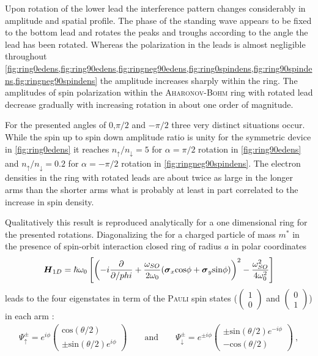Upon rotation of the lower lead the interference pattern changes considerably in amplitude and spatial profile. The phase of the standing wave appears to be fixed to the bottom lead and rotates the peaks and troughs according to the angle the lead has been rotated. Whereas the polarization in the leads is almost negligible throughout \cref{fig:ring0edens,fig:ring90edens,fig:ringneg90edens,fig:ring0spindens,fig:ring90spindens,fig:ringneg90spindens} the amplitude increases sharply within the ring. The amplitudes of spin polarization within the \textsc{Aharonov-Bohm} ring with rotated lead decrease gradually with increasing rotation in about one order of magnitude.\par
For the presented angles of 0,$\pi/2$ and $-\pi/2$ three very distinct situations occur. While the spin up to spin down amplitude ratio is unity for the symmetric device in \cref{fig:ring0edens} it reaches $n_{\uparrow}/n_{\downarrow}=5$ for $\alpha=\pi/2$ rotation in \cref{fig:ring90edens} and $n_{\uparrow}/n_{\downarrow}=0.2$ for $\alpha=-\pi/2$ rotation in \cref{fig:ringneg90spindens}. The electron densities in the ring with rotated leads are about twice as large in the longer arms than the shorter arms what is probably at least in part correlated to the increase in spin density.\par
Qualitatively this result is reproduced analytically for a one dimensional ring for the presented rotations. Diagonalizing the \hamil{} for a charged particle of mass $m^*$ in the presence of spin-orbit interaction closed ring of radius $a$ in polar coordinates \cite{PhysRevB.73.155325} 
\begin{align}
\boldsymbol{H}_{1D}=\hbar\omega_0 \left[\left(-i\frac{\partial }{\partial /phi}+\frac{\omega_{SO}}{2\omega_{0}} (\boldsymbol{\sigma}_x\text{cos}\phi+\boldsymbol{\sigma}_y\text{sin}\phi)\right)^2-\frac{\omega_{SO}^2}{4\omega_0^2}\right]
\end{align}
leads to the four eigenstates in term of the \textsc{Pauli} spin states ($\begin{pmatrix}1\\0\end{pmatrix}$ and $\begin{pmatrix}0\\1\end{pmatrix}$) in each arm \cite{nitta1999.695}:
\begin{align}
  \Psi^{\pm}_{\uparrow} = e^{i\phi}\begin{pmatrix}\text{cos}(\theta/2)\\\pm\text{sin}(\theta/2)e^{i\phi}\end{pmatrix} 
  \qquad\text{and}\qquad
  \Psi^{\pm}_{\downarrow} = e^{\pm i\phi}\begin{pmatrix}\pm\text{sin}(\theta/2)e^{-i\phi}\\-\text{cos}(\theta/2)\end{pmatrix}\ ,
\end{align}
